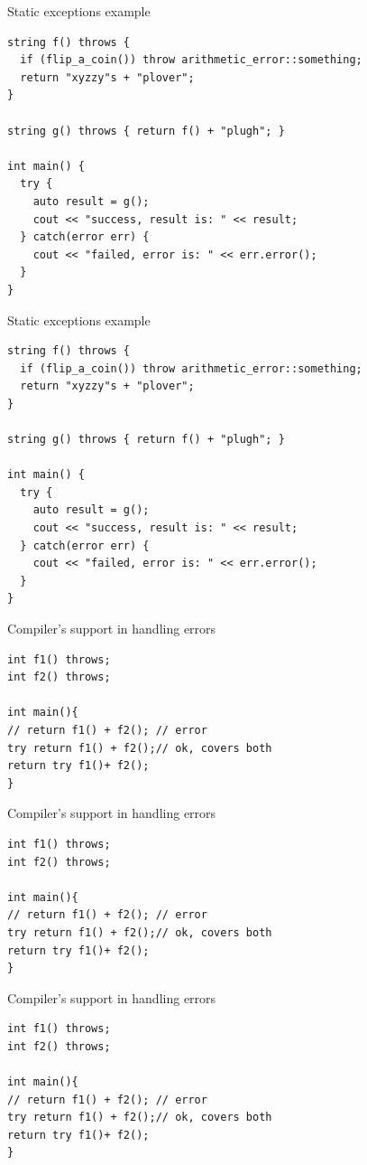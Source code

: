 \documentclass[10pt]{beamer}
\begin{document}
\begin{frame}[fragile]{Static exceptions example}
	
	\begin{verbatim}
string f() throws {
  if (flip_a_coin()) throw arithmetic_error::something;
  return "xyzzy"s + "plover"; 
}

string g() throws { return f() + "plugh"; } 

int main() {
  try {
    auto result = g();
    cout << "success, result is: " << result;
  } catch(error err) {
    cout << "failed, error is: " << err.error();
  }
}
	\end{verbatim}
\end{frame}

\begin{frame}[fragile]{Static exceptions example}
	
	\begin{verbatim}
string f() throws {
  if (flip_a_coin()) throw arithmetic_error::something;
  return "xyzzy"s + "plover"; 
}

string g() throws { return f() + "plugh"; } 

int main() {
  try {
    auto result = g();
    cout << "success, result is: " << result;
  } catch(error err) {
    cout << "failed, error is: " << err.error();
  }
}
	\end{verbatim}
\end{frame}

\begin{frame}[fragile]{Compiler's support in handling errors}
	\begin{verbatim}
int f1() throws;	
int f2() throws;

int main(){
// return f1() + f2(); // error
try return f1() + f2();// ok, covers both 
return try f1()+ f2();
}
	\end{verbatim}
\end{frame}

\begin{frame}[fragile]{Compiler's support in handling errors}
	\begin{verbatim}
int f1() throws;	
int f2() throws;

int main(){
// return f1() + f2(); // error
try return f1() + f2();// ok, covers both 
return try f1()+ f2();
}
	\end{verbatim}
\end{frame}

\begin{frame}[fragile]{Compiler's support in handling errors}
	\begin{verbatim}
int f1() throws;	
int f2() throws;

int main(){
// return f1() + f2(); // error
try return f1() + f2();// ok, covers both 
return try f1()+ f2();
}
	\end{verbatim}
\end{frame}
\end{document}
